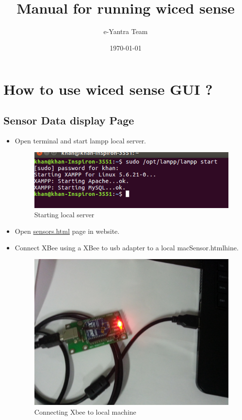\documentclass[11pt,a4paper]{article}
\begin{document}
\begin{titlepage}
\title{Manual for running wiced sense}
\author{e-Yantra Team}
\date{\today}
\maketitle
\end{titlepage}
\listoffigures
\tableofcontents
    \newpage
	\section{How to use wiced sense GUI ?}
	\subsection{Sensor Data display Page}
	
	 \begin{itemize}
	 \item Open terminal and start lampp local server.
	 
	 	\begin{figure}[h]
    \centering
	\includegraphics[scale=0.5]{lampstart.png}
	\caption{Starting local server}
	\end{figure}
	 
	 \item Open \href{https://github.com/eYSIP-2016/Wiced-Sense/blob/master/Codes/wiced_web/sensors.html}{sensors.html} page in website.
	 \item Connect XBee using a XBee to usb adapter to a local macSensor.htmlhine.
	 
	 \begin{figure}[h]
        \centering
	    \includegraphics[scale=0.1]{20160722_194935.jpg}
	    \caption{Connecting Xbee to local machine}
	\end{figure}
	 

\end{itemize}
\end{document}
